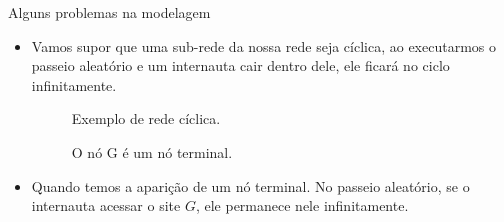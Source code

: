 \documentclass{beamer}
\begin{document}
\begin{frame}{Alguns problemas na modelagem}
\begin{itemize}


\item Vamos supor que uma sub-rede da nossa rede seja cíclica, ao executarmos o passeio aleatório e um internauta cair dentro dele, ele ficará no ciclo infinitamente.



\begin{figure}[H]
    \centering
    \begin{minipage}{.5\textwidth}
        \centering
        \caption{Exemplo de rede cíclica.}
        \label{graph1}
    \end{minipage}%
    \begin{minipage}{.5\textwidth}
        \centering
        \caption{O nó G é um nó terminal.}
        \label{graph2}
    \end{minipage}
\end{figure}

\vspace{1pt}

\item Quando temos a aparição de um nó terminal. No passeio aleatório, se o internauta acessar o site $G$, ele permanece nele infinitamente.


\end{itemize}
\end{frame}
\end{document}
